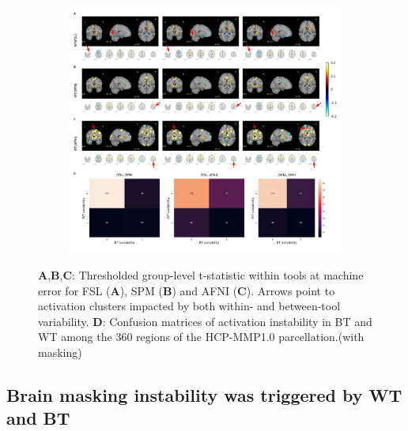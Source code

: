 \documentclass[11pt,onecolumn]{article}
\begin{document}

\begin{figure}[ht]
  \begin{subfigure}[ht]{\textwidth}
    \centering
    \includegraphics[width=\textwidth]{figures/act_deact-marked.pdf}
  \end{subfigure}
  \centering
  \caption{\textbf{A},\textbf{B},\textbf{C}: Thresholded group-level
    t-statistic within tools at machine error for FSL (\textbf{A}), SPM
    (\textbf{B}) and AFNI (\textbf{C}). Arrows point to activation clusters
    impacted by both within- and between-tool variability.
     \textbf{D}: Confusion matrices of
    activation instability in BT and WT among the 360 regions of the
    HCP-MMP1.0 parcellation.(with masking)}
  \label{fig:thresh-maps}
\end{figure}

\subsection{Brain masking instability was triggered by WT and BT}
\end{document}
